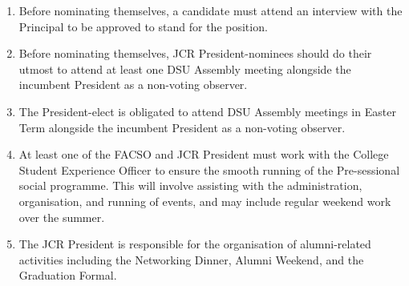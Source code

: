 \begin{enumerate}
        \item Before nominating themselves, a candidate must attend an interview with the Principal to be approved to stand for the position.
        \item Before nominating themselves, JCR President-nominees should do their utmost to attend at least one DSU Assembly meeting alongside the incumbent President as a non-voting observer.
        \item The President-elect is obligated to attend DSU Assembly meetings in Easter Term alongside the incumbent President as a non-voting observer.
        \item At least one of the FACSO and JCR President must work with the College Student Experience Officer to ensure the smooth running of the Pre-sessional social programme. This will involve assisting with the administration, organisation, and running of events, and may include regular weekend work over the summer.
        \item The JCR President is responsible for the organisation of alumni-related activities including the Networking Dinner, Alumni Weekend, and the Graduation Formal.
\end{enumerate}

